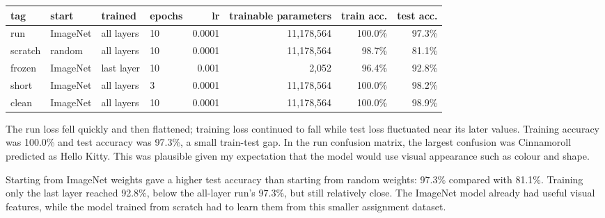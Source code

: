 \documentclass[11pt]{article}
\begin{document}
\begin{center}\footnotesize
\begin{tabular}{llllrrrr}
\toprule
tag & start & trained & epochs & lr & trainable parameters & train acc. & test acc. \\
\midrule
run & ImageNet & all layers & 10 & 0.0001 & 11,178,564 & 100.0\% & 97.3\% \\
scratch & random & all layers & 10 & 0.0001 & 11,178,564 & 98.7\% & 81.1\% \\
frozen & ImageNet & last layer & 10 & 0.001 & 2,052 & 96.4\% & 92.8\% \\
short & ImageNet & all layers & 3 & 0.0001 & 11,178,564 & 100.0\% & 98.2\% \\
clean & ImageNet & all layers & 10 & 0.0001 & 11,178,564 & 100.0\% & 98.9\% \\
\bottomrule
\end{tabular}
\end{center}

The run loss fell quickly and then flattened; training loss continued to fall
while test loss fluctuated near its later values. Training accuracy was
100.0\% and test accuracy was 97.3\%, a small train-test gap. In the run
confusion matrix, the largest confusion was Cinnamoroll predicted as Hello
Kitty. This was plausible given my expectation that the model would use
visual appearance such as colour and shape.

Starting from ImageNet weights gave a higher test accuracy than starting from
random weights: 97.3\% compared with 81.1\%. Training only the last layer
reached 92.8\%, below the all-layer run's 97.3\%, but still relatively close.
The ImageNet model already had useful visual features, while the model trained
from scratch had to learn them from this smaller assignment dataset.

\begin{center}
\hfill
{}
\end{center}
\begin{center}
\hfill
{}
\end{center}
\begin{center}
\hfill
{}
\end{center}
\begin{center}
\hfill
{}
\end{center}
\begin{center}
\hfill
{}
\end{center}
\end{document}
